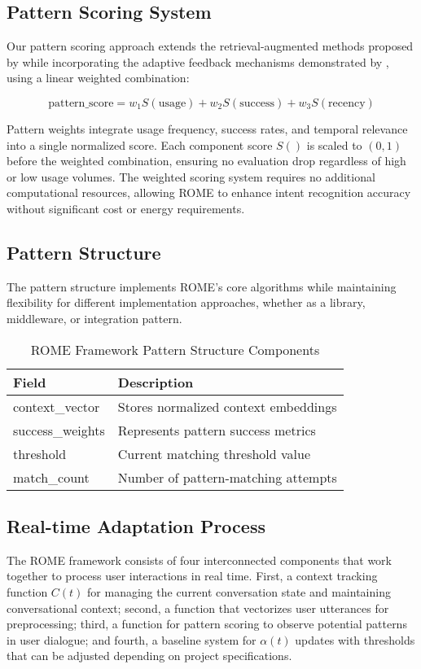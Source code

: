 \documentclass[12pt]{article}
\begin{document}
\subsection{Pattern Scoring System}
Our pattern scoring approach extends the retrieval-augmented methods proposed by \citet{lewis2020} while incorporating the adaptive feedback mechanisms demonstrated by \citet{hancock2019}, using a linear weighted combination:

$$\text{pattern\_score} = w_1S(\text{usage}) + w_2S(\text{success}) + w_3S(\text{recency})$$

Pattern weights integrate usage frequency, success rates, and temporal relevance into a single normalized score. Each component score $S()$ is scaled to $(0,1)$ before the weighted combination, ensuring no evaluation drop regardless of high or low usage volumes. The weighted scoring system requires no additional computational resources, allowing ROME to enhance intent recognition accuracy without significant cost or energy requirements.

\subsection{Pattern Structure}
The pattern structure implements ROME's core algorithms while maintaining flexibility for different implementation approaches, whether as a library, middleware, or integration pattern.

\begin{table}[h]
\caption{ROME Framework Pattern Structure Components}
\begin{center}
\begin{tabular}{|l|l|}
\hline
\textbf{Field} & \textbf{Description} \\
\hline
context\_vector & Stores normalized context embeddings \\
success\_weights & Represents pattern success metrics \\
threshold & Current matching threshold value \\
match\_count & Number of pattern-matching attempts \\
\hline
\end{tabular}
\end{center}
\label{tab:pattern-structure}
\end{table}

\subsection{Real-time Adaptation Process}
The ROME framework consists of four interconnected components that work together to process user interactions in real time. First, a context tracking function $C(t)$ for managing the current conversation state and maintaining conversational context; second, a function that vectorizes user utterances for preprocessing; third, a function for pattern scoring to observe potential patterns in user dialogue; and fourth, a baseline system for $\alpha(t)$ updates with thresholds that can be adjusted depending on project specifications.
\end{document}
